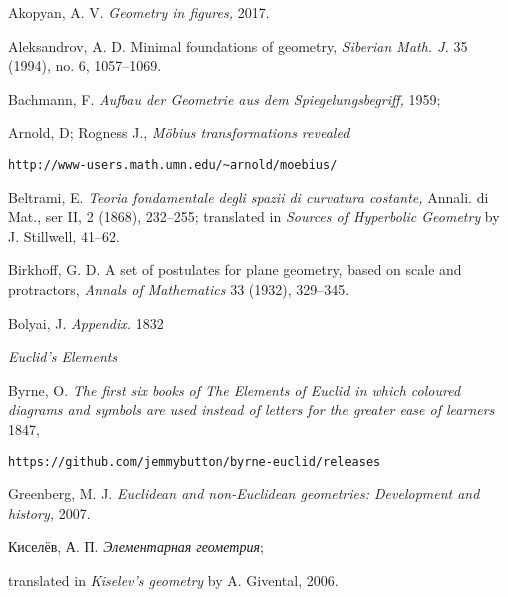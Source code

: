 \renewcommand{\bibname}{Used resources}
\begin{thebibliography}{52}

Akopyan, A. V. 
\textit{Geometry in figures,} 2017.


Aleksandrov, A. D.
Minimal foundations of geometry,
\textit{Siberian Math. J.} 35 (1994), no. 6, 1057--1069.

 Bachmann, F.
\textit{Aufbau der Geometrie aus dem Spiegelungsbegriff,} 1959;

 Arnold, D; Rogness J., \textit{M\"obius transformations revealed}
\begin{verbatim}http://www-users.math.umn.edu/~arnold/moebius/\end{verbatim}


  Beltrami, E.
\textit{Teoria fondamentale degli spazii di curvatura costante,} 
Annali. di Mat., ser II, 2 (1868), 232--255;
translated in \textit{Sources of Hyperbolic Geometry} by J. Stillwell,  41--62.

Birkhoff, G. D.
A set of postulates for plane geometry,
based on scale and protractors, 
\textit{Annals of Mathematics} 33 (1932), 329--345.

 Bolyai, J. \textit{Appendix.} 1832

\textit{Euclid's Elements}

 Byrne,  O. 
\textit{The first six books of
The Elements of Euclid
in which coloured diagrams and symbols are used
instead of letters for the greater ease of learners
} 1847,
\begin{verbatim}https://github.com/jemmybutton/byrne-euclid/releases\end{verbatim}

Greenberg, M. J.
\textit{Euclidean and non-Euclidean geometries: Development and history,} 2007.

\begin{otherlanguage}{russian}
Киселёв, А. П. 
\textit{Элементарная геометрия};
\end{otherlanguage}
translated in 
\textit{Kiselev's geometry} by A. Givental, 2006.




\end{thebibliography}
